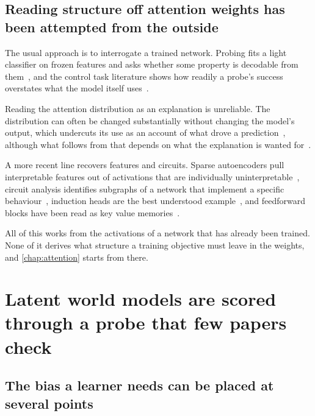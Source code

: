 \subsection{Reading structure off attention weights has been attempted from the outside}
\label{sec:bg_interp}

The usual approach is to interrogate a trained network. Probing fits a light
classifier on frozen features and asks whether some property is decodable from
them~\cite{belinkov_probing_2022}, and the control task literature shows how
readily a probe's success overstates what the model itself
uses~\cite{hewitt_designing_2019}.

Reading the attention distribution as an explanation is unreliable. The
distribution can often be changed substantially without changing the model's
output, which undercuts its use as an account of what drove a
prediction~\cite{jain_attention_2019}, although what follows from that depends
on what the explanation is wanted for~\cite{wiegreffe_attention_2019}.

A more recent line recovers features and circuits. Sparse autoencoders pull
interpretable features out of activations that are individually
uninterpretable~\cite{huben_sparse_2024, bricken_monosemanticity_2023}, circuit
analysis identifies subgraphs of a network that implement a specific
behaviour~\cite{olah_zoom_2020}, induction heads are the best understood
example~\cite{olsson_context_2022}, and feedforward blocks have been read as
key value memories~\cite{geva_transformer_2021}.

All of this works from the activations of a network that has already been
trained. None of it derives what structure a training objective must leave in
the weights, and \cref{chap:attention} starts from there.


\section{Latent world models are scored through a probe that few papers check}
\label{sec:bg_supplied}

\subsection{The bias a learner needs can be placed at several points}
\label{sec:bg_inductive}

